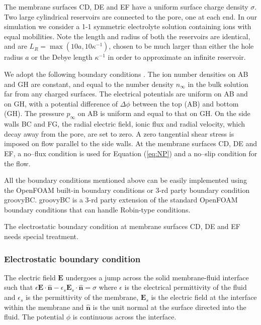 The membrane surfaces CD, DE and EF have a uniform surface charge density $\sigma$. Two large cylindrical reservoirs are connected to the pore, one at each end. In our simulation we consider a 1-1 symmetric electrolyte solution containing ions with equal mobilities. Note the length and radius of both the reservoirs are identical, and are $L_R=\max(10a, 10\kappa^{-1})$, chosen to be much larger than either the hole radius $a$ or the Debye length $\kappa^{-1}$  in order to approximate an infinite reservoir. 

We adopt the following boundary conditions \cite{Mao2013}. The ion number densities on AB and GH are constant, and equal to the number density $n_\infty$ in the bulk solution far from any charged surfaces. The electrical potentials are uniform on AB and on GH, with a potential difference of $\Delta\phi$ between the top (AB) and bottom (GH). The pressure $p_{\infty}$ on AB is uniform and equal to that on GH. On the side walls BC and FG, the radial electric field, ionic flux and radial velocity, which decay away from the pore, are set to zero. A zero tangential shear stress is imposed on flow parallel to the side walls. At the membrane surfaces CD, DE and EF, a no--flux condition is used for Equation (\ref{eq:NP}) and a no--slip condition for the flow. 

All the boundary conditions mentioned above can be easily implemented using the OpenFOAM built-in boundary conditions or 3-rd party boundary condition \textsf{groovyBC}. \textsf{groovyBC} is a 3-rd party extension of the standard OpenFOAM boundary conditions that can handle Robin-type conditions.

The electrostatic boundary condition at membrane surfaces CD, DE and EF needs special treatment.

\subsubsection{Electrostatic boundary condition}
The electric field $\mathbf{E}$ undergoes a jump across the solid membrane-fluid interface such that
$\epsilon \mathbf{E} \cdot  \hat{\mathbf{n}} - \epsilon_{s} \mathbf{E}_{s} \cdot \hat{\mathbf{n}} = \sigma$ 
where $\epsilon$ is the electrical permittivity of the fluid and $\epsilon_{s}$ is the permittivity of the membrane, $\mathbf{E}_{s}$ is the electric field at the interface within the membrane and $\hat{\mathbf{n}}$ is the unit normal at the surface directed into the fluid. The potential $\phi$ is continuous across the interface. 

